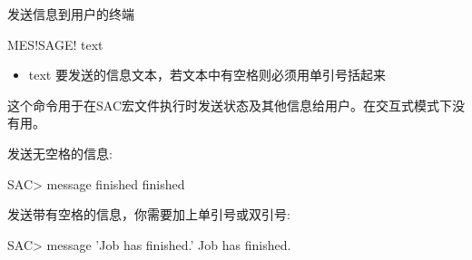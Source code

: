 \label{cmd:message}

发送信息到用户的终端

\begin{SACSTX}
MES!SAGE! text
\end{SACSTX}

\begin{itemize}
\item text 要发送的信息文本，若文本中有空格则必须用单引号括起来
\end{itemize}

这个命令用于在SAC宏文件执行时发送状态及其他信息给用户。在交互式模式下没有用。

发送无空格的信息:
\begin{SACCode}
SAC> message finished
 finished
\end{SACCode}

发送带有空格的信息，你需要加上单引号或双引号:
\begin{SACCode}
SAC> message 'Job has finished.'
 Job has finished.
\end{SACCode}
